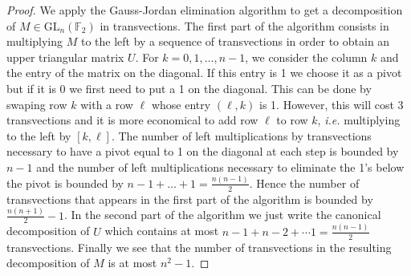 \documentclass[a4paper,12pt,fleqn]{article}
\newcommand\GL[1][n]{\mathrm{GL}_{#1}(\mathbb{F}_2)}
\begin{document}
\begin{proof}
  We apply the Gauss-Jordan elimination algorithm to get a decomposition of $M\in\GL$ in transvections. The first part of the algorithm consists in
  multiplying $M$ to the left by
  a sequence of transvections in order to obtain an upper triangular matrix $U$. For $k=0,1,\dots,n-1$, we consider the column $k$ and the entry of the matrix on the diagonal. If this entry is 1 we choose it as a pivot but if it is 0 we first need to put a 1 on the diagonal. This can be done by swaping row $k$ with a row $\ell$ whose entry $(\ell,k)$ is 1. However, this will cost 3 transvections and it is more economical to add row $\ell$ to row $k$, \emph{i.e.} multiplying to the left by $[k,\ell]$.
  The number of left multiplications by transvections necessary to have a pivot equal to 1 on the diagonal at each step is bounded by $n-1$ and the number of left multiplications necessary to eliminate the 1's below the pivot is bounded by $n-1+\dots+1=\frac{n(n-1)}{2}$. Hence the number of transvections that appears in the first part of the algorithm is bounded
  by $\frac{n(n+1)}{2}-1$. In the second part of the algorithm we just write the canonical decomposition of $U$ which contains at most $n-1+n-2+\cdots 1=\frac{n(n-1)}{2}$ transvections. Finally we see that the number of transvections in the resulting decomposition of $M$ is at most $n^2-1$.
  \end{proof}
 
  
\end{document}
